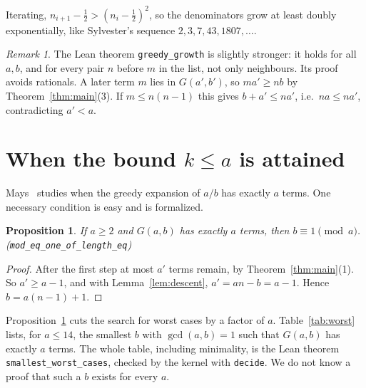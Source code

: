 \documentclass[11pt]{article}
\newtheorem{proposition}[theorem]{Proposition}
\theoremstyle{definition}
\theoremstyle{remark}
\newtheorem{remark}[theorem]{Remark}
\begin{document}
Iterating, $n_{i+1} - \tfrac12 > (n_i - \tfrac12)^2$, so the denominators grow at least
doubly exponentially, like Sylvester's sequence $2, 3, 7, 43, 1807, \dots$.

\begin{remark}
The Lean theorem \texttt{greedy\_growth} is slightly stronger: it holds for all $a, b$, and for
every pair $n$ before $m$ in the list, not only neighbours. Its proof avoids rationals. A later
term $m$ lies in $G(a',b')$, so $m a' \ge nb$ by Theorem~\ref{thm:main}(3). If $m \le n(n-1)$
this gives $b + a' \le n a'$, i.e.\ $n a \le n a'$, contradicting $a' < a$.
\end{remark}

\section{When the bound $k \le a$ is attained}

Mays~\cite{mays} studies when the greedy expansion of $a/b$ has exactly $a$ terms. One
necessary condition is easy and is formalized.

\begin{proposition}\label{prop:mod}
If $a \ge 2$ and $G(a,b)$ has exactly $a$ terms, then $b \equiv 1 \pmod a$.
\\ \hspace*{\fill}(\texttt{mod\_eq\_one\_of\_length\_eq})
\end{proposition}

\begin{proof}
After the first step at most $a'$ terms remain, by Theorem~\ref{thm:main}(1). So $a' \ge a - 1$,
and with Lemma~\ref{lem:descent}, $a' = an - b = a - 1$. Hence $b = a(n-1) + 1$.
\end{proof}

Proposition~\ref{prop:mod} cuts the search for worst cases by a factor of $a$.
Table~\ref{tab:worst} lists, for $a \le 14$, the smallest $b$ with $\gcd(a,b)=1$ such that
$G(a,b)$ has exactly $a$ terms. The whole table, including minimality, is the Lean theorem
\texttt{smallest\_worst\_cases}, checked by the kernel with \texttt{decide}. We do not know a
proof that such a $b$ exists for every $a$.
\end{document}
